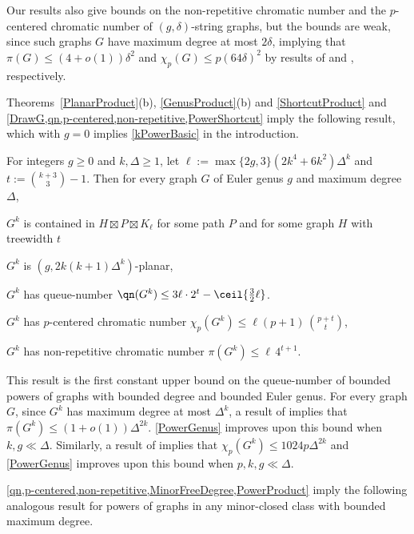 
 Our results also give bounds on the non-repetitive chromatic number and the $p$-centered chromatic number of $(g,\delta)$-string graphs, but the bounds are weak, since such graphs $G$ have maximum degree at most $2\delta$, implying that $\pi(G) \leq (4+o(1))\delta^2$ and $\chi_p(G)\le p(64\delta)^2$ by results of \citet{DJKW16} and \citet{DFMS21}, respectively.

 Theorems~\ref{PlanarProduct}(b), \ref{GenusProduct}(b) and \cref{ShortcutProduct} and  \cref{DrawG,qn,p-centered,non-repetitive,PowerShortcut} imply the following result, which with $g=0$ implies  \cref{kPowerBasic} in the introduction.

 \begin{thm}
 \label{PowerGenus}
 For integers $g\geq 0$ and $k,\Delta\geq 1$, let $\ell:= \max\{2g,3\} (2k^4+6k^2) \Delta^{k}$ and $t:= \binom{k+3}{3}-1$. Then for every graph $G$ of Euler genus $g$ and maximum degree $\Delta$,
 \begin{compactitem}
 \item $G^k$ is contained in $H\boxtimes P \boxtimes K_{\ell}$ for some path $P$ and for some graph $H$ with treewidth $t$
 \item $G^k$ is $(g, 2k(k+1)\Delta^{k} )$-planar,
 \item $G^k$ has queue-number $\qn(G^k) \leq 3 \ell \cdot 2^t - \ceil{\tfrac{3}{2}\ell}$.
 \item $G^k$ has  $p$-centered chromatic number $\chi_p(G^k) \leq \ell (p+1)\,  \binom{p+t}{t}$,
 \item $G^k$ has  non-repetitive chromatic number $ \pi(G^k) \leq \ell \, 4^{t+1}$.
 \end{compactitem}
 \end{thm}


 This result is the first constant upper bound on the queue-number of bounded powers of graphs with bounded degree and bounded Euler genus.  For every graph $G$, since $G^k$ has maximum degree at most $\Delta^k$, a result of \citet{DJKW16} implies that $\pi(G^k) \leq (1+o(1))\Delta^{2k}$. \cref{PowerGenus} improves upon this bound when $k,g\ll\Delta$.  Similarly, a result of \citet{DFMS21} implies that $\chi_p(G^k)\le 1024p\Delta^{2k}$ and \cref{PowerGenus} improves upon this bound when $p,k,g\ll\Delta$.

 \cref{qn,p-centered,non-repetitive,MinorFreeDegree,PowerProduct} imply the following analogous result for powers of graphs in any minor-closed class with bounded maximum degree.

